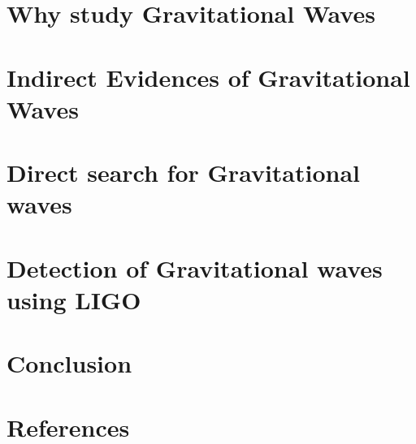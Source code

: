 \documentclass[11pt, a4paper]{article}
\begin{document}
\section{Why study Gravitational Waves}


\section{Indirect Evidences of Gravitational Waves}


\section{Direct search for Gravitational waves}






\section{Detection of Gravitational waves using LIGO }



\section{Conclusion}




\section{References}

\end{document}
